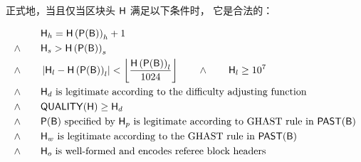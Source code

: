 \medskip

正式地，当且仅当区块头 $\textsf{H}$ 满足以下条件时， 它是合法的：


\begin{align}
	&{\textsf{H}_h} = \textsf{H}\left(\mathsf{P}(\textsf{B})\right)_{h}+1\\
	\land \qquad &{\textsf{H}_s} > \textsf{H}\left(\mathsf{P}(\textsf{B})\right)_{s}\\
	\land \qquad & \left|{\textsf{H}_l} -\textsf{H}\left(\mathsf{P}(\textsf{B})\right)_{l}\right|< \left\lfloor\frac{\textsf{H}\left(\mathsf{P}(\textsf{B})\right)_{l}}{1024}\right\rfloor \qquad
	\land \qquad {\textsf{H}_l}\ge 10^7 \label{eq:blockgas}\\
	\land \qquad & \text{${\textsf{H}_d}$ is legitimate according to the difficulty adjusting function}\\
	\land \qquad & \mathsf{QUALITY}(\textsf{H}) \ge {\textsf{H}_d}\\
	\land \qquad & {\text{$\mathsf{P}(\textsf{B})$ specified by ${\textsf{H}_p}$ is legitimate according to GHAST rule in $\mathsf{PAST}(\textsf{B})$}}\\
	\land \qquad & {\text{${\textsf{H}_w}$ is legitimate according to the GHAST rule in $\mathsf{PAST}(\textsf{B})$}}\\
	\land \qquad & {\text{${\textsf{H}_o}$ is well-formed and encodes referee block headers}}
\end{align}



